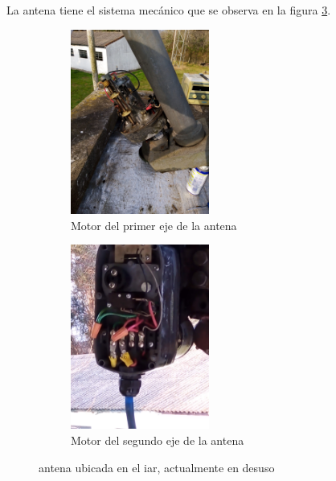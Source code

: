 La antena tiene el sistema mecánico que se observa en la figura \ref{fig_mec_ant}. 
\begin{figure}[ht]
	\begin{subfigure}{0.5\textwidth}
		\centering
		\includegraphics[width=0.5\textwidth]{parte_1/cap1/mot1}
		\caption{Motor del primer eje de la antena }
		\label{fig_mec_ant1}		
	\end{subfigure}
	\hfill 
	\begin{subfigure}{0.5\textwidth}
		\centering
		\includegraphics[width=0.5\textwidth]{parte_1/cap1/mot2}
		\caption{Motor del segundo eje de la antena }
		\label{fig_mec_ant2}
	\end{subfigure}
	
	\caption{antena ubicada en el iar, actualmente en desuso}
	\label{fig_mec_ant}
\end{figure}


